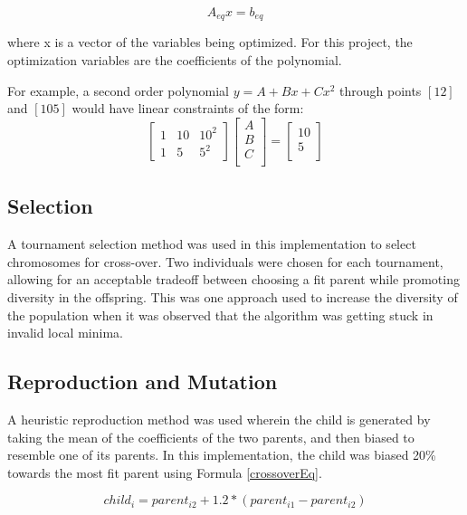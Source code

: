\begin{equation}
A_{eq}x = b_{eq}
\end{equation}

where x is a vector of the variables being optimized. For this project, the optimization variables are the coefficients of the polynomial.

For example, a second order polynomial $y = A + Bx + Cx^2$ through points $[1 2]$ and $[10 5]$ would have linear constraints of the form:
\begin{equation}
	\begin{bmatrix}
	1 & 10 & 10^2 \\
	1 & 5 & 5^2
	\end{bmatrix}
	\begin{bmatrix}
	A \\
	B \\
	C \\
	\end{bmatrix} =
	\begin{bmatrix}
	10 \\
	5 \\
	\end{bmatrix}
\end{equation}

\subsection{Selection}
A tournament selection method was used in this implementation to select chromosomes for cross-over. Two individuals were chosen for each tournament, allowing for an acceptable tradeoff between choosing a fit parent while promoting diversity in the offspring. This was one approach used to increase the diversity of the population when it was observed that the algorithm was getting stuck in invalid local minima.

\subsection{Reproduction and Mutation}
A heuristic reproduction method was used wherein the child is generated by taking the mean of the coefficients of the two parents, and then biased to resemble one of its parents. In this implementation, the child was biased 20\% towards the most fit parent using Formula \ref{crossoverEq}.

\begin{equation} \label{crossoverEq}
	child_i = parent_{i2} + 1.2 * (parent_{i1} - parent_{i2})
\end{equation}

